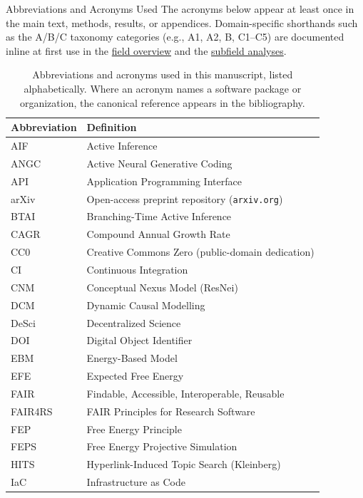 \documentclass[
  ignorenonframetext,
]{beamer}
\begin{document}
\begin{frame}[allowframebreaks]{Abbreviations and Acronyms Used}
\protect{}\label{abbreviations-and-acronyms-used}
The acronyms below appear at least once in the main text, methods,
results, or appendices. Domain-specific shorthands such as the A/B/C
taxonomy categories (e.g., A1, A2, B, C1--C5) are documented inline at
first use in the \hyperref[sec:field_overview]{field overview} and the
\hyperref[sec:subfield_analyses]{subfield analyses}.

\begin{table}[H]
\centering
\caption{Abbreviations and acronyms used in this manuscript, listed alphabetically. Where an acronym names a software package or organization, the canonical reference appears in the bibliography.}
\label{tab:abbreviations}
\begin{tabular}{ll}
\toprule
\textbf{Abbreviation} & \textbf{Definition} \\
\midrule
AIF & Active Inference \\
ANGC & Active Neural Generative Coding \\
API & Application Programming Interface \\
arXiv & Open-access preprint repository (\texttt{arxiv.org}) \\
BTAI & Branching-Time Active Inference \\
CAGR & Compound Annual Growth Rate \\
CC0 & Creative Commons Zero (public-domain dedication) \\
CI & Continuous Integration \\
CNM & Conceptual Nexus Model (ResNei) \\
DCM & Dynamic Causal Modelling \\
DeSci & Decentralized Science \\
DOI & Digital Object Identifier \\
EBM & Energy-Based Model \\
EFE & Expected Free Energy \\
FAIR & Findable, Accessible, Interoperable, Reusable \\
FAIR4RS & FAIR Principles for Research Software \\
FEP & Free Energy Principle \\
FEPS & Free Energy Projective Simulation \\
HITS & Hyperlink-Induced Topic Search (Kleinberg) \\
IaC & Infrastructure as Code \\

\end{tabular}
\end{table}
\end{frame}
\end{document}
